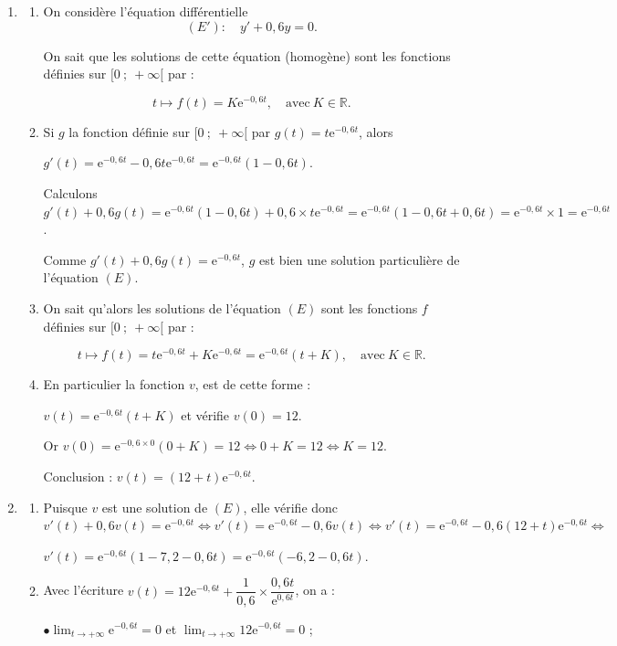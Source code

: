 \documentclass[10pt]{article}
\providecommand{\R}{\mathbb{R}}
\providecommand{\e}{{\mathrm{e}}}
\begin{document}
\begin{enumerate}
\item 
	\begin{enumerate}
		\item On considère l'équation différentielle 
		\[(E') :\quad y' + 0,6y = 0.\]

On sait que les solutions de cette équation (homogène) sont les fonctions définies sur $[0~;~+ \infty[$ par :

\[t \longmapsto f(t) = K\e^{-0,6t}, \quad \text{avec}\: K \in \R.\]
		\item Si $g$ la fonction définie sur $[0~;~+\infty[$ par $g(t) = t\e^{-0,6t}$, alors 

$g'(t) = \e^{-0,6t} - 0,6t\e^{-0,6t} = \e^{-0,6t}(1 - 0,6t)$.

Calculons $g'(t) + 0,6g(t) = \e^{-0,6t}(1 - 0,6t) + 0,6 \times t\e^{-0,6t} = \e^{-0,6t}(1 - 0,6t + 0,6t) = \e^{-0,6t} \times 1 = \e^{-0,6t}$.

Comme $g'(t) + 0,6g(t) = \e^{-0,6t}$, $g$ est bien une solution particulière de l'équation $(E)$.

		\item On sait qu'alors les solutions de l'équation $(E)$ sont les fonctions  $f$ définies sur $[0~;~+ \infty[$ par :
		
\[t \longmapsto f(t) = t\e^{-0,6t} + K\e^{-0,6t} = \e^{-0,6t}(t + K),  \quad \text{avec}\: K \in \R.\]
\item En particulier la fonction $v$, est de cette forme :

$v(t) = \e^{-0,6t}(t + K)$  et vérifie $v(0) = 12$.

Or $v(0) = \e^{-0,6\times 0}(0 + K) = 12 \iff 0 + K = 12 \iff K = 12$.

Conclusion : $v(t) = (12 + t)\e^{-0,6t}$.
	\end{enumerate}
\item 
	\begin{enumerate}
		\item Puisque $v$ est une solution de $(E)$, elle vérifie donc $v'(t) + 0,6v(t) = \e^{-0,6t}\iff v'(t)  = \e^{-0,6t} - 0,6v(t) \iff v'(t) = \e^{-0,6t} - 0,6(12 + t)\e^{-0,6t} \iff$

$ v'(t) = \e^{-0,6t}(1 - 7,2 - 0,6t) = \e^{-0,6t}(- 6,2 - 0,6t)$.
		\item Avec l'écriture $v(t) = 12\e^{-0,6t} + \dfrac{1}{0,6} \times \dfrac{0,6t}{\e^{0,6t}}$, on a :

$\bullet \displaystyle\lim_{t \to + \infty} \e^{-0,6t} = 0$ et $\displaystyle\lim_{t \to + \infty} 12\e^{-0,6t} = 0$ ;


\end{enumerate}
\end{enumerate}
\end{document}
